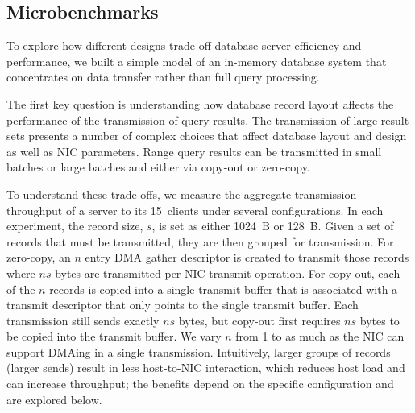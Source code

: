 \subsection{Microbenchmarks}
\label{sec:zero-copy-tput}

%
To explore how different designs trade-off database server efficiency and
performance, we built a simple model of an in-memory database system that
concentrates on data transfer rather than full query processing.

The first key question is understanding how database record layout affects the
performance of the transmission of query results.  The transmission of large
result sets presents a number of complex choices that affect
database layout and design as well as NIC parameters.  Range query
results can be transmitted in small batches or large batches and either via
copy-out or zero-copy.

To understand these trade-offs, we measure the aggregate transmission
throughput of a server to its 15~clients under several
configurations.  In each experiment, the record size, $s$, is set as either 1024~B or
128~B. Given a set of records that must be transmitted, they are then grouped
for transmission. For zero-copy, an $n$ entry DMA gather descriptor is created
to transmit those records where $ns$ bytes are transmitted per NIC transmit
operation. For copy-out, each of the $n$ records is copied into a single
transmit buffer that is associated with a transmit descriptor that only points
to the single transmit buffer. Each transmission still sends exactly $ns$
bytes, but copy-out first requires $ns$ bytes to be copied into the transmit buffer.
We vary $n$ from 1 to as much as the NIC can support DMAing in a single transmission.
Intuitively, larger groups of records (larger sends) result in less host-to-NIC
interaction, which reduces host load and can increase throughput; the benefits
depend on the specific configuration and are explored below.

